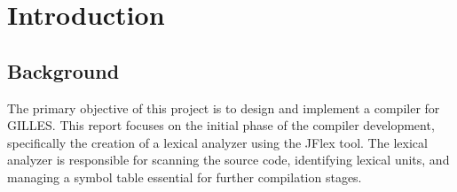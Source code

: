 \setcounter{secnumdepth}{1}

\chapter{Introduction}

\section{Background}
	The primary objective of this project is to design and implement a compiler for GILLES. This report focuses on the initial phase of the compiler development, specifically the creation of a lexical analyzer using the JFlex tool. The lexical analyzer is responsible for scanning the source code, identifying lexical units, and managing a symbol table essential for further compilation stages.

